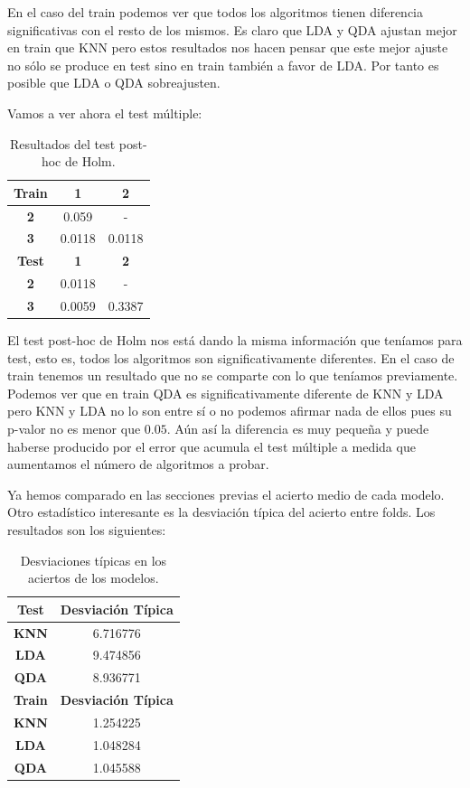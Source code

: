 \documentclass[12pt,a4paper]{article}
\begin{document}
En el caso del train podemos ver que todos los algoritmos tienen diferencia significativas con el resto de los mismos. Es claro que LDA y QDA ajustan mejor en train que KNN pero estos resultados nos hacen pensar que este mejor ajuste no sólo se produce en test sino en train también a favor de LDA. Por tanto es posible que LDA o QDA sobreajusten.

Vamos a ver ahora el test múltiple:

\begin{table}[H]
	\centering
	\begin{tabular}{|c|c|c|}
		\hline
		\textbf{Train} & \textbf{1} & \textbf{2} \\ \hline
		\textbf{2}     & 0.059      & -          \\ \hline
		\textbf{3}     & 0.0118     & 0.0118     \\ \hline
		\textbf{Test}  & \textbf{1} & \textbf{2} \\ \hline
		\textbf{2}     & 0.0118     & -          \\ \hline
		\textbf{3}     & 0.0059     & 0.3387     \\ \hline
	\end{tabular}
	\caption{Resultados del test post-hoc de Holm.}
\end{table}

El test post-hoc de Holm nos está dando la misma información que teníamos para test, esto es, todos los algoritmos son significativamente diferentes. En el caso de train tenemos un resultado que no se comparte con lo que teníamos previamente. Podemos ver que en train QDA es significativamente diferente de KNN y LDA pero KNN y LDA no lo son entre sí o no podemos afirmar nada de ellos pues su p-valor no es menor que $0.05$. Aún así la diferencia es muy pequeña y puede haberse producido por el error que acumula el test múltiple a medida que aumentamos el número de algoritmos a probar.

Ya hemos comparado en las secciones previas el acierto medio de cada modelo. Otro estadístico interesante es la desviación típica del acierto entre folds. Los resultados son los siguientes:

\begin{table}[H]
	\centering
	\begin{tabular}{|c|c|}
		\hline
		\textbf{Test}  & \textbf{Desviación Típica} \\ \hline
		\textbf{KNN}   & 6.716776                   \\ \hline
		\textbf{LDA}   & 9.474856                   \\ \hline
		\textbf{QDA}   & 8.936771                   \\ \hline
		\textbf{Train} & \textbf{Desviación Típica} \\ \hline
		\textbf{KNN}   & 1.254225                   \\ \hline
		\textbf{LDA}   & 1.048284                   \\ \hline
		\textbf{QDA}   & 1.045588                   \\ \hline
	\end{tabular}
\caption{Desviaciones típicas en los aciertos de los modelos.}
\end{table}
\end{document}
